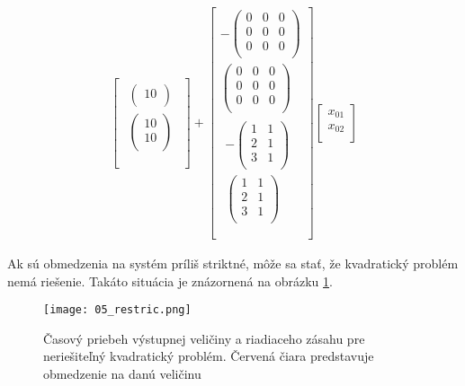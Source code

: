 \begin{equation}
\begin{split}
\begin{bmatrix}
\begin{matrix}
\begin{pmatrix}
10 \\
\end{pmatrix} \\
\begin{pmatrix}
10 \\
10 \\
\end{pmatrix} \\
\end{matrix} \\
\end{bmatrix} + \begin{bmatrix}
 - \begin{pmatrix}
0 & 0 & 0 \\
0 & 0 & 0 \\
0 & 0 & 0 \\
\end{pmatrix} \\
\begin{pmatrix}
0 & 0 & 0 \\
0 & 0 & 0 \\
0 & 0 & 0 \\
\end{pmatrix} \\
\begin{matrix}
 - \begin{pmatrix}
1 & 1 \\
2 & 1 \\
3 & 1 \\
\end{pmatrix} \\
\begin{pmatrix}
1 & 1 \\
2 & 1 \\
3 & 1 \\
\end{pmatrix} \\
\end{matrix} \\
\end{bmatrix}\begin{bmatrix}
x_{01} \\
x_{02} \\
\end{bmatrix}
\end{split}
\end{equation}

Ak sú obmedzenia na systém príliš striktné, môže sa stať, že kvadratický
problém nemá riešenie. Takáto situácia je znázornená na obrázku \ref{05_restric}.

\begin{figure}[!htbp]
\centering
\texttt{[image: 05\_restric.png]}
\caption{Časový priebeh výstupnej veličiny a riadiaceho zásahu pre neriešiteľný kvadratický problém. Červená čiara predstavuje obmedzenie na danú veličinu}
\label{05_restric}
\end{figure}

